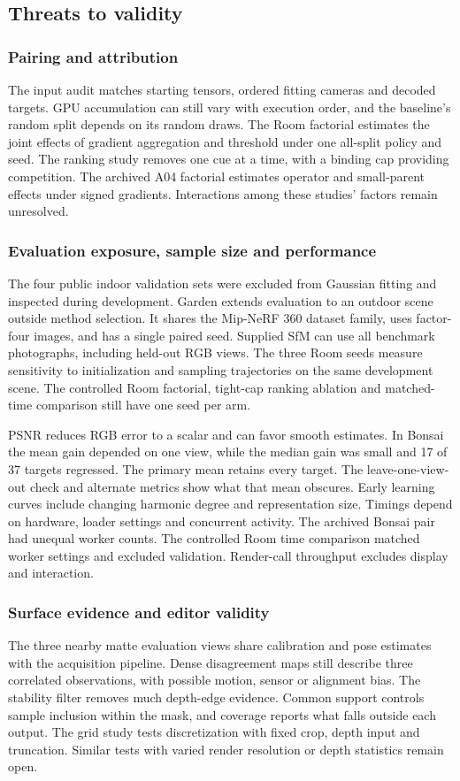 \subsection{Threats to validity}
\subsubsection{Pairing and attribution}
The input audit matches starting tensors, ordered fitting cameras and decoded targets. GPU accumulation can still vary with execution order, and the baseline's random split depends on its random draws. The Room factorial estimates the joint effects of gradient aggregation and threshold under one all-split policy and seed. The ranking study removes one cue at a time, with a binding cap providing competition. The archived A04 factorial estimates operator and small-parent effects under signed gradients. Interactions among these studies' factors remain unresolved.

\subsubsection{Evaluation exposure, sample size and performance}
The four public indoor validation sets were excluded from Gaussian fitting and inspected during development. Garden extends evaluation to an outdoor scene outside method selection. It shares the Mip-NeRF 360 dataset family, uses factor-four images, and has a single paired seed. Supplied SfM can use all benchmark photographs, including held-out RGB views. The three Room seeds measure sensitivity to initialization and sampling trajectories on the same development scene. The controlled Room factorial, tight-cap ranking ablation and matched-time comparison still have one seed per arm.

PSNR reduces RGB error to a scalar and can favor smooth estimates. In Bonsai the mean gain depended on one view, while the median gain was small and 17 of 37 targets regressed. The primary mean retains every target. The leave-one-view-out check and alternate metrics show what that mean obscures. Early learning curves include changing harmonic degree and representation size. Timings depend on hardware, loader settings and concurrent activity. The archived Bonsai pair had unequal worker counts. The controlled Room time comparison matched worker settings and excluded validation. Render-call throughput excludes display and interaction.

\subsubsection{Surface evidence and editor validity}
The three nearby matte evaluation views share calibration and pose estimates with the acquisition pipeline. Dense disagreement maps still describe three correlated observations, with possible motion, sensor or alignment bias. The stability filter removes much depth-edge evidence. Common support controls sample inclusion within the mask, and coverage reports what falls outside each output. The grid study tests discretization with fixed crop, depth input and truncation. Similar tests with varied render resolution or depth statistics remain open.

